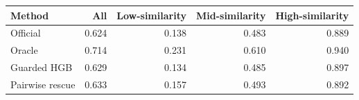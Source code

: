 \begin{tabular}{lrrrr}
\toprule
Method & All & Low-similarity & Mid-similarity & High-similarity \\
\midrule
Official & 0.624 & 0.138 & 0.483 & 0.889 \\
Oracle & 0.714 & 0.231 & 0.610 & 0.940 \\
Guarded HGB & 0.629 & 0.134 & 0.485 & 0.897 \\
Pairwise rescue & 0.633 & 0.157 & 0.493 & 0.892 \\
\bottomrule
\end{tabular}
